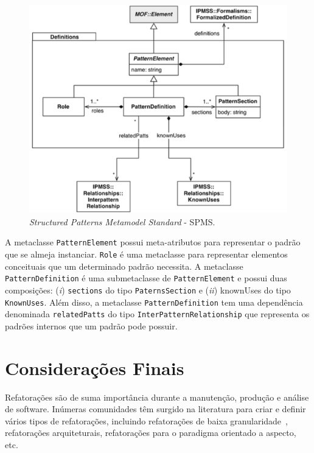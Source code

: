\begin{figure}[h]
	\centering
	\caption{\textit{Structured Patterns Metamodel Standard} - SPMS.}
	\label{fig:SPMS_metamodel_related}
	\includegraphics[scale=0.57]{images/SPMS_related}
\end{figure}

A metaclasse \texttt{PatternElement} possui meta-atributos para representar o padrão que se almeja instanciar. \texttt{Role} é uma metaclasse para representar elementos conceituais que um determinado padrão necessita. A metaclasse \texttt{PatternDefinition} é uma submetaclasse de \texttt{PatternElement} e possui duas composições: (\textit{i}) \texttt{sections} do tipo \texttt{PaternsSection} e (\textit{ii}) knownUses do tipo \texttt{KnownUses}. Além disso, a metaclasse \texttt{PatternDefinition} tem uma dependência denominada \texttt{relatedPatts} do tipo \texttt{InterPatternRelationship} que representa os padrões internos que um padrão pode possuir.


\section{Considerações Finais}
\label{sec:consideracoes_finais_SRM}

Refatorações são de suma importância durante a manutenção, produção e análise de software. Inúmeras comunidades têm surgido na literatura para criar e definir vários tipos de refatorações, incluindo refatorações de baixa granularidade~\cite{Fowler1999, Demeyer1, Demeyer2}, refatorações arquiteturais, refatorações para o paradigma orientado a aspecto, etc. 

